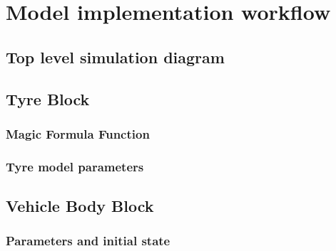 \chapter{Model implementation workflow}
\label{chap:workflow}
\section{Top level simulation diagram}
\label{sec:toplevel}
\section{Tyre Block}
\label{sec:tyreblock}
\subsection{Magic Formula Function}
\subsection{Tyre model parameters}
\section{Vehicle Body Block}
\label{sec:bodyblock}
\subsection{Parameters and initial state}
